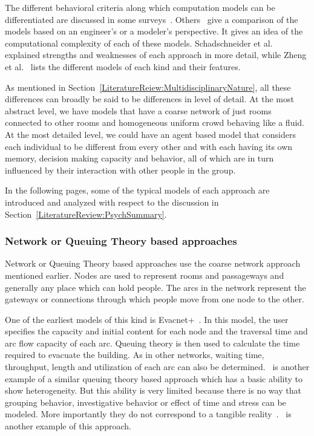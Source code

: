 The different behavioral criteria along which computation models can be differentiated are discussed in some surveys~\cite{Gwynne:1999vi,Kuligowski:2005tt}. Others~\cite{Schadschneider:2008cz,Zheng:2009id} give a comparison of the models based on an engineer's or a modeler's perspective. It gives an idea of the computational complexity of each of these models. Schadschneider et al.~\cite{Schadschneider:2008cz} explained strengths and weaknesses of each approach in more detail, while Zheng et al.~\cite{Zheng:2009id} lists the different models of each kind and their features.

As mentioned in Section~\ref{LiteratureReiew:MultidisciplinaryNature}, all these differences can broadly be said to be differences in level of detail. At the most abstract level, we have models that have a coarse network of just rooms connected to other rooms and homogeneous uniform crowd behaving like a fluid. At the most detailed level, we could have an agent based model that considers each individual to be different from every other and with each having its own memory, decision making capacity and behavior, all of which are in turn influenced by their interaction with other people in the group.

In the following pages, some of the typical models of each approach are introduced and analyzed with respect to the discussion in Section~\ref{LiteratureReview:PsychSummary}.


\subsubsection{Network or Queuing Theory based approaches}

Network or Queuing Theory based approaches use the coarse network approach mentioned earlier. Nodes are used to represent rooms and passageways and generally any place which can hold people. The arcs in the network represent the gateways or connections through which people move from one node to the other.

One of the earliest models of this kind is Evacnet+~\cite{kisko1985evacnet+}. In this model, the user specifies the capacity and initial content for each node and the traversal time and arc flow capacity of each arc. Queuing theory is then used to calculate the time required to evacuate the building. As in other networks, waiting time, throughput, length and utilization of each arc can also be determined.~\cite{Lammel:2009dj} is another example of a similar queuing theory based approach which has a basic ability to show heterogeneity. But this ability is very limited because there is no way that grouping behavior, investigative behavior or effect of time and stress can be modeled. More importantly they do not correspond to a tangible reality~\cite{Bierlaire:2003uj}.~\cite{Lino:2009td} is another example of this approach.

